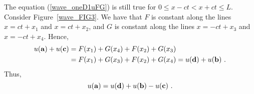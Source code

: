 
The equation (\ref{wave_oneD1uFG}) is still true for
$0 \leq x-ct < x+ct \leq L$.  Consider Figure~\ref{wave_FIG3}.
We have that $F$ is constant along
the lines $x=ct+x_1$ and $x=ct+x_2$, and $G$ is constant along the
lines $x=-ct+x_3$ and $x=-ct+x_4$.  Hence,
\begin{align*}
u(\mathbf{a}) + u(\mathbf{c}) &= F(x_1) + G(x_4) + F(x_2) + G(x_3) \\
&= F(x_1) + G(x_3) + F(x_2) + G(x_4) = u(\mathbf{d}) + u(\mathbf{b}) \ .
\end{align*}
Thus,
\begin{equation} \label{wave_geo1}
u(\mathbf{a}) = u(\mathbf{d}) + u(\mathbf{b}) - u(\mathbf{c})  \ .
\end{equation}

